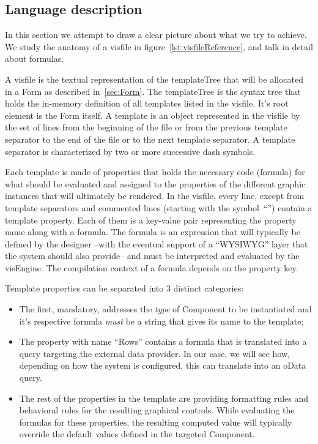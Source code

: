 \subsection{Language description}

In this section we attempt to draw a clear picture about what we try to achieve. We study the anatomy of a visfile in figure~\ref{lst:visfileReference}, and talk in detail about formulas.



A visfile is the textual representation of the templateTree that will be allocated in a Form as described in~\ref{sec:Form}. The templateTree is the syntax tree that holds the in-memory definition of all templates listed in the visfile. It's root element is the Form itself. A template is an object represented in the visfile by the set of lines from the beginning of the file or from the previous template separator to the end of the file or to the next template separator. A template separator is characterized by two or more successive dash symbols.

Each template is made of properties that holds the necessary code (formula) for what should be evaluated and assigned to the properties of the different graphic instances that will ultimately be rendered. In the visfile, every line, except from template separators and commented lines (starting with the symbol~``\textquotesingle'') contain a template property. Each of them is a key-value pair representing the property name along with a formula. The formula is an expression that will typically be defined by the designer --with the eventual support of a ``WYSIWYG'' layer that the system should also provide-- and must be interpreted and evaluated by the visEngine. The compilation context of a formula depends on the property key.

Template properties can be separated into 3 distinct categories:
\begin{itemize}
    \item The first, mandatory, addresses the \emph{type} of Component to be instantiated and it's respective formula \emph{must} be a string that gives its name to the template;
    \item The property with name ``Rows'' contains a formula that is translated into a query targeting the external data provider. In our case, we will see how, depending on how the system is configured, this can translate into an oData query.
    \item The rest of the properties in the template are providing formatting rules and behavioral rules for the resulting graphical controls. While evaluating the formulas for these properties, the resulting computed value will typically override the default values defined in the targeted Component.
\end{itemize}

